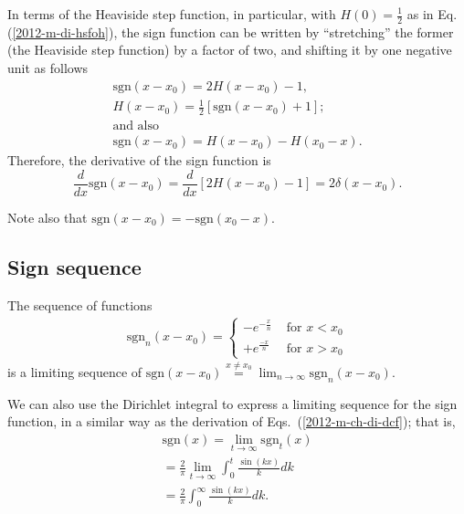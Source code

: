 In terms of  the  Heaviside step function, in particular, with
$H(0)=\frac{1}{2}$ as in Eq. (\ref{2012-m-di-hsfoh}),
the sign function can be written by ``stretching'' the former (the Heaviside step function) by a factor of two,
and shifting it by one negative unit as follows
\begin{equation}
\begin{split}
\textrm{sgn}(x-x_0) = 2H(x-x_0) -1,\\
H(x-x_0) = \frac{1}{2} \left[ \textrm{sgn}(x-x_0)+1\right];  \\
\textrm{and also}\\
\textrm{sgn}(x-x_0) = H(x-x_0) - H(x_0-x).
\end{split}
\label{2011-m-cbhsf}
\end{equation}
Therefore, the derivative of the sign function is
\begin{equation}
\frac{d}{dx}\textrm{sgn}(x-x_0) = \frac{d}{dx} \left[2H(x-x_0) -1\right] =2 \delta(x-x_0).
\end{equation}

Note also that  $\textrm{sgn}(x-x_0) =  - \textrm{sgn}(x_0-x)$.

\subsection{Sign sequence}


The sequence of functions
\begin{equation}
\begin{split}
\textrm{sgn}_n(x-x_0)
=
\left\{
\begin{array}{rl}
- e^{-\frac{x}{n}}&\textrm{ for } x < x_0\\
+ e^{\frac{-x}{n}}&\textrm{ for } x > x_0
\end{array}
\right.
\end{split}
\label{2012-m-ch-di-lsegn}
\end{equation}
is a limiting sequence of
$
\textrm{sgn}(x-x_0)\stackrel{x\neq x_0}{=} \lim_{n\rightarrow \infty} \textrm{sgn}_n(x-x_0)
$.


We can also use the Dirichlet integral
to express a limiting sequence for the sign function,
in a similar way as the derivation of Eqs.~(\ref{2012-m-ch-di-dcf}); that is,
\begin{equation}
\begin{split}
\textrm{sgn}(x)= \lim_{t \rightarrow \infty} \textrm{sgn}_t (x)
\\
= \frac{2}{\pi }\lim_{t \rightarrow \infty}\int_0^t \frac{\sin (kx)}{k} dk
\\
=
\frac{2}{\pi }\int_0^\infty \frac{\sin (kx)}{k} dk
.
\end{split}
\label{2015-m-ch-di-sign}
\end{equation}

